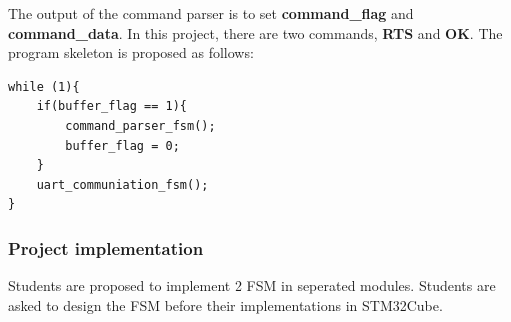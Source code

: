 The output of the command parser is to set \textbf{command\_flag} and \textbf{command\_data}. In this project, there are two commands, \textbf{RTS} and \textbf{OK}. The program skeleton is proposed as follows:
\begin{lstlisting}[caption= Program structure]
while (1){
    if(buffer_flag == 1){
        command_parser_fsm();
        buffer_flag = 0;
    }
    uart_communiation_fsm();
}
\end{lstlisting}

\subsubsection{Project implementation}
Students are proposed to implement 2 FSM in seperated modules. Students are asked to design the FSM before their implementations in STM32Cube.
